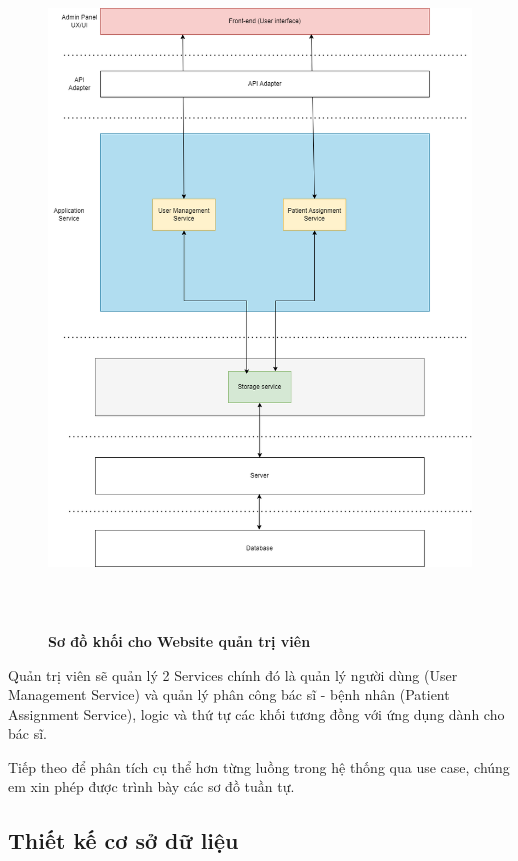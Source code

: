 \begin{figure}[H]
  \centering
  \includegraphics[width=16cm,height=18cm]{Images/system/fmECG_architecture-Admin.drawio.png}
  \caption[Sơ đồ khối cho Website quản trị viên]{\bfseries \fontsize{12pt}{0pt}\selectfont Sơ đồ khối cho Website quản trị viên}
  \label{fmECG_architecture-Admin} %
\end{figure}

Quản trị viên sẽ quản lý 2 Services chính đó là quản lý người dùng (User Management Service) và quản lý phân công
bác sĩ - bệnh nhân (Patient Assignment Service), logic và thứ tự các khối tương đồng với ứng dụng dành cho bác sĩ.

Tiếp theo để phân tích cụ thể hơn từng luồng trong hệ thống qua use case, chúng em xin phép được trình bày các sơ đồ tuần
tự. 
\newpage


\subsection{Thiết kế cơ sở dữ liệu}
\label{design_database}


